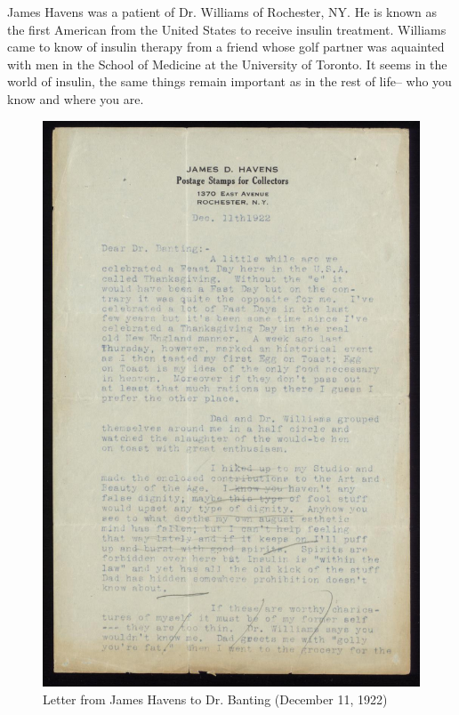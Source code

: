 \documentclass[12pt]{article}
\begin{document}
James Havens was a patient of Dr. Williams of Rochester, NY. He is known as the first American from the United States to receive insulin treatment. Williams came to know of insulin therapy from a friend whose golf partner was aquainted with men in the School of Medicine at the University of Toronto. It seems in the world of insulin, the same things remain important as in the rest of life-- who you know and where you are. 
\begin{figure}[H]
\centering
  \includegraphics [width=5in]{thanksgivinghavens}
  \caption{Letter from James Havens to Dr. Banting (December 11, 1922)}
  \label{fig: Thanksgiving Letter}
\end{figure}
\end{document}
